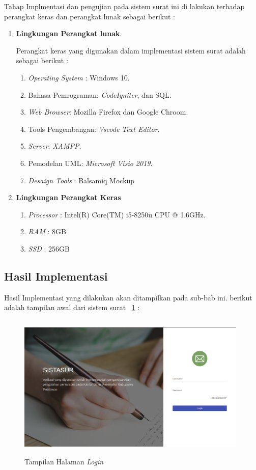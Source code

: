 Tahap Implmentasi dan pengujian pada sistem surat ini di lakukan terhadap perangkat keras dan perangkat lunak sebagai berikut :
\begin{enumerate}
	\item \textbf{Lingkungan Perangkat lunak}.
	
	Perangkat keras yang digunakan dalam implementasi sistem surat adalah sebagai berikut :
	
	\begin{enumerate}
		\item \textit{Operating System} : Windows 10.
		\item  Bahasa Pemrograman: \textit{CodeIgniter}, dan SQL.
		\item \textit{Web Browser}: Mozilla Firefox dan Google Chroom.
		\item Tools Pengembangan: \textit{Vscode Text Editor}.
		\item \textit{Server}: \textit{XAMPP}.
		\item Pemodelan UML: \textit{Microsoft Visio 2019}.
		\item \textit{Desaign Tools} : Balsamiq Mockup
	\end{enumerate}
	
	\item \textbf{Lingkungan Perangkat Keras}
	\begin{enumerate}
		\item \textit{Processor} : Intel(R) Core(TM) i5-8250u CPU @ 1.6GHz.
		\item \textit{RAM} : 8GB
		\item \textit{SSD} : 256GB
	\end{enumerate}
\end{enumerate}

\subsection{Hasil Implementasi}
Hasil Implementasi yang dilakukan akan ditampilkan pada sub-bab ini. berikut adalah tampilan awal dari sistem surat  \pic~\ref{loginpage} :
\begin{figure}
	\centering
	\includegraphics[height= 7cm, width=11cm]{konten/gambar/UISistemSurat/0.0.LoginPage.png}
	\caption{Tampilan Halaman \textit{Login}}
	\label{loginpage}
\end{figure}

